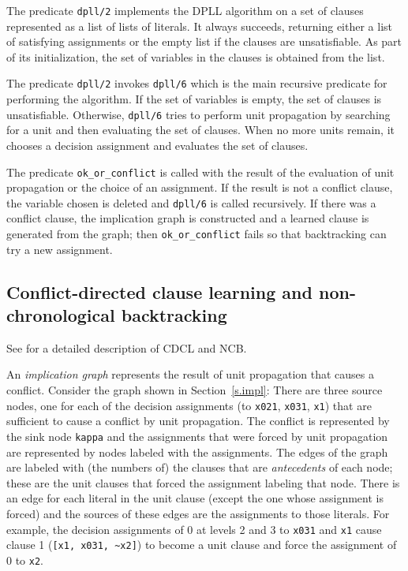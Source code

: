 \documentclass[11pt]{article}
\newcommand*{\p}[1]{\textup{\texttt{#1}}}
\begin{document}
The predicate \p{dpll/2} implements the DPLL algorithm on a set of clauses
represented as a list of lists of literals. It always succeeds,
returning either a list of satisfying assignments or the empty list if
the clauses are unsatisfiable. As part of its initialization, the set of
variables in the clauses is obtained from the list. 

The predicate \p{dpll/2} invokes \p{dpll/6} which is the main recursive
predicate for performing the algorithm. If the set of variables is
empty, the set of clauses is unsatisfiable. Otherwise, \p{dpll/6} tries
to perform unit propagation by searching for a unit and then evaluating
the set of clauses. When no more units remain, it chooses a decision
assignment and evaluates the set of clauses.

The predicate \p{ok\_or\_conflict} is called with the result of the
evaluation of unit propagation or the choice of an assignment. If the
result is not a conflict clause, the variable chosen is deleted and
\p{dpll/6} is called recursively. If there was a conflict clause, the
implication graph is constructed and a learned clause is generated from
the graph; then \p{ok\_or\_conflict} fails so that backtracking can try
a new assignment.

\subsection{Conflict-directed clause learning and non-chronological backtracking}

See \cite{mlm} for a detailed description of CDCL and NCB.

An \emph{implication graph} represents the result of unit propagation
that causes a conflict. Consider the graph shown in
Section~\ref{s.impl}: There are three source nodes, one for each of the
decision assignments (to \p{x021}, \p{x031}, \p{x1}) that are sufficient
to cause a conflict by unit propagation. The conflict is represented by
the sink node \p{kappa} and the assignments that were forced by unit
propagation are represented by nodes labeled with the assignments. The
edges of the graph are labeled with (the numbers of) the clauses that
are \emph{antecedents} of each node; these are the unit clauses that
forced the assignment labeling that node. There is an edge for each
literal in the unit clause (except the one whose assignment is forced)
and the sources of these edges are the assignments to those literals.
For example, the decision assignments of 0 at levels 2 and 3 to \p{x031}
and \p{x1} cause clause 1 (\verb+[x1, x031, ~x2]+) to become a unit
clause and force the assignment of 0 to \p{x2}.
\end{document}
